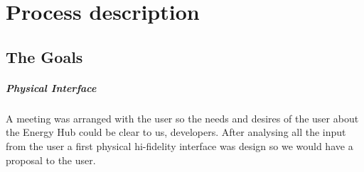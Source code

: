 \chapter{Process description}
\section{The Goals}
\paragraph{Physical Interface}

A meeting was arranged with the user so the needs and desires of the user about the Energy Hub could be clear to us, developers. After analysing all the input from the user a first physical hi-fidelity interface was design so we would have a proposal to the user. 

